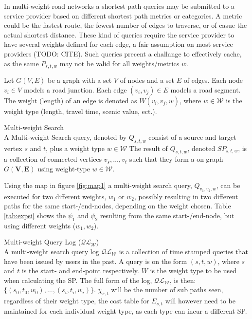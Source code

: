 In multi-weight road networks\cite{icdeMouratidisLY10} a shortest path queries may be submitted to a service provider based on different shortest path metrics or categories. A metric could be the fastest route, the fewest number of edges to traverse, or of casue the actual shortest distance. These kind of queries require the \spath service provider to have several weights defined for each edge, a fair assumption on most service providers (TODO: CITE).
Such queries precent a challange to effectively cache, as the same \spath $P_{s,t,w}$ may not be valid for all weights/metrics $w$.




\begin{definition}
Let $G(V, E)$ be a graph with a set $V$ of nodes and a set $E$ of edges.
Each node $v_i \in V$ models a road junction. Each edge $(v_i, v_j) \in
E$ models a road segment. The weight (length) of an edge is denoted as $W(v_i, v_j, w)$, where $w \in \mathcal{W}$ is the weight type (length, travel time, scenic value, ect.).
\end{definition}



\begin{definition}{Multi-weight Search}\\
A Multi-weight Search query, denoted by $Q_{s,t,w}$ consist of a source and target vertex $s$ and $t$, plus a weight type $w \in \mathcal{W}$ 
The result of $Q_{s,t,w}$, denoted $SP_{s,t,w}$, is a collection of connected vertices $v_s,\dotsc,v_t$ such that they form a \spath on graph $G\mathbf{(V,E)}$ using weight-type $w \in \mathcal{W}$.
\end{definition}


Using the map in figure \ref{fig:map1} a multi-weight search query, $Q_{v_1,v_2,w}$, can be executed for two different weights, $w_1$ or $w_2$, possibly resulting in two different paths for the same start-/end-nodes, depending on the weight chosen. Table \ref{tab:expsi} shows the \spath $\psi_1$ and $\psi_2$ resulting from the same start-/end-node, but using different weights ($w_1, w_2$).


\begin{definition}{Multi-weight Query Log ($\mathcal{QL_W}$)}\\
A multi-weight search query log $\mathcal{QL_W}$ is a collection of time stamped queries that have been issued by users in the past.
A query is on the form $(s,t,w)$, where $s$ and $t$ is the start- and end-point respectively. $W$ is the weight type to be used when calculating the SP. The full form of the log, $\mathcal{QL_W}$,  is then: $\{(s_0,t_0,w_0),\dots,(s_i,t_i,w_i)\}$. $\chi_{s,t}$ will be the number of sub paths seen, regardless of their weight type, the cost table for $E_{s,t}$ will however need to be maintained for each individual weight type, as each type can incur a different SP.
\end{definition}


